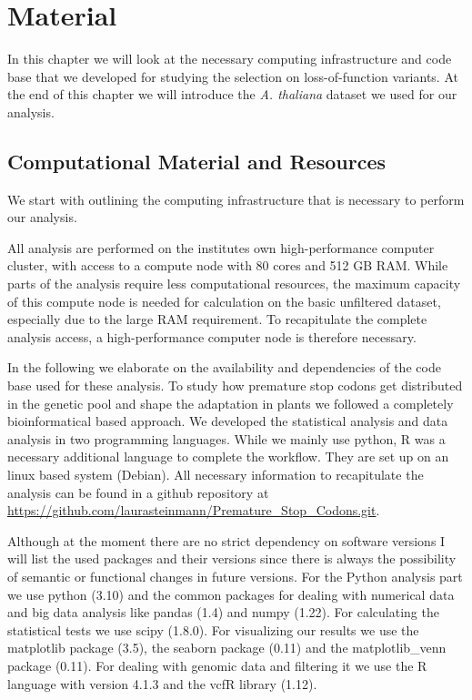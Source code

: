 \chapter{Material}
In this chapter we will look at the necessary computing infrastructure and code base that we developed for studying the selection on loss-of-function variants. At the end of this chapter we will introduce the \textit{A. thaliana} dataset we used for our analysis.
\section{Computational Material and Resources}
We start with outlining the computing infrastructure that is necessary to perform our analysis.

All analysis are performed on the institutes own high-performance computer cluster, with access to a compute node with 80 cores and 512 GB RAM. While parts of the analysis require less computational resources, the maximum capacity of this compute node is needed for calculation on the basic unfiltered dataset, especially due to the large RAM requirement. To recapitulate the complete analysis access, a high-performance computer node is therefore necessary. 

In the following we elaborate on the availability and dependencies of the code base used for these analysis. To study how premature stop codons get distributed in the genetic pool and shape the adaptation in plants we followed a completely bioinformatical based approach. We developed the statistical analysis and data analysis in two programming languages. While we mainly use python, R was a necessary additional language to complete the workflow. They are set up on an linux based system (Debian). All necessary information to recapitulate the analysis can be found in a github repository at \url{https://github.com/laurasteinmann/Premature_Stop_Codons.git}.

Although at the moment there are no strict dependency on software versions I will list the used packages and their versions since there is always the possibility of semantic or functional changes in future versions. For the Python analysis part we use python (3.10) and the common packages for dealing with numerical data and big data analysis like pandas (1.4) and  numpy (1.22). For calculating the statistical tests we use scipy (1.8.0). For visualizing our results we use the matplotlib package (3.5), the seaborn package (0.11) and the matplotlib\_venn package (0.11). For dealing with genomic data and filtering it we use the R language with version 4.1.3 and the vcfR library (1.12).
